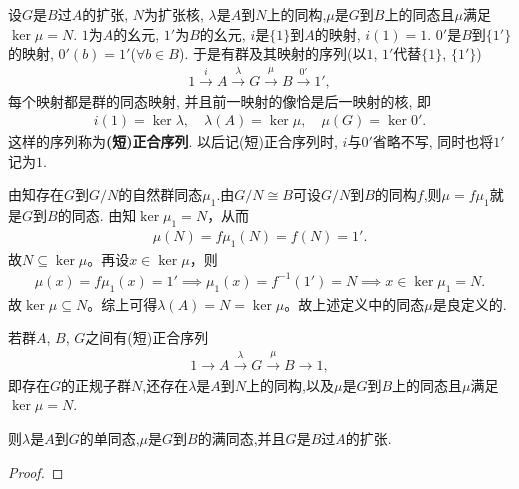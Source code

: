 \documentclass[../../main.tex]{subfiles}%
\begin{document}
\begin{definition}
设$G$是$B$过$A$的扩张, $N$为扩张核, $\lambda$是$A$到$N$上的同构,$\mu$是$G$到$B$上的同态且$\mu$满足$\ker\mu = N$. $1$为$A$的幺元, $1'$为$B$的幺元, $i$是$\{1\}$到$A$的映射, $i(1)=1$. $0'$是$B$到$\{1'\}$的映射, $0'(b)=1'$($\forall b\in B$). 于是有群及其映射的序列(以$1$, $1'$代替$\{1\}$, $\{1'\}$)
\begin{align*}
1 \stackrel{i}{\longrightarrow} A \stackrel{\lambda}{\longrightarrow} G \stackrel{\mu}{\longrightarrow} B \stackrel{0'}{\longrightarrow} 1',
\end{align*}
每个映射都是群的同态映射, 并且前一映射的像恰是后一映射的核, 即
\begin{align*}
i(1) = \ker\lambda, \quad\lambda(A) = \ker \mu  , \quad \mu(G) = \ker 0'.
\end{align*}
这样的序列称为\textbf{(短)正合序列}.
以后记(短)正合序列时, $i$与$0'$省略不写, 同时也将$1'$记为$1$.
\end{definition}
\begin{remark}
由知存在$G$到$G/N$的自然群同态$\mu_1$.由$G/N\cong B$可设$G/N$到$B$的同构$f$,则$\mu = f\mu_1$就是$G$到$B$的同态.
由知$ \ker \mu_1 = N $，从而
\begin{align*}
\mu(N) = f\mu_1(N) = f(N) = 1'.
\end{align*}
故$ N \subseteq \ker \mu $。再设$ x \in \ker \mu $，则
\begin{align*}
\mu(x) = f\mu_1(x) = 1' \implies \mu_1(x) = f^{-1}(1') = N \implies x \in \ker \mu_1 = N.
\end{align*}
故$ \ker \mu \subseteq N $。综上可得$ \lambda(A) = N = \ker \mu $。故上述定义中的同态$\mu$是良定义的.

\end{remark}

\begin{proposition}\label{proposition:正合序列的基本性质}
若群$A$, $B$, $G$之间有(短)正合序列
\begin{align*}
1\longrightarrow A \stackrel{\lambda}{\longrightarrow} G \stackrel{\mu}{\longrightarrow} B\longrightarrow 1,
\end{align*}
即存在$G$的正规子群$N$,还存在$\lambda$是$A$到$N$上的同构,以及$\mu$是$G$到$B$上的同态且$\mu$满足$\ker\mu = N$.

则$\lambda$是$A$到$G$的单同态,$\mu$是$G$到$B$的满同态,并且$G$是$B$过$A$的扩张.
\end{proposition}
\begin{proof}



\end{proof}
\end{document}
